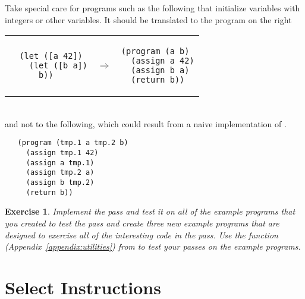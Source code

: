 \documentclass[11pt]{book}
\newtheorem{exercise}[theorem]{Exercise}
\begin{document}
Take special care for programs such as the following that initialize
variables with integers or other variables. It should be translated
to the program on the right \\
\begin{tabular}{lll}
\begin{minipage}{0.4\textwidth}
\begin{lstlisting}
  (let ([a 42])
    (let ([b a])
      b))
\end{lstlisting}
\end{minipage}
&
$\Rightarrow$
&
\begin{minipage}{0.4\textwidth}
\begin{lstlisting}
(program (a b)
  (assign a 42)
  (assign b a)
  (return b))
\end{lstlisting}
\end{minipage}
\end{tabular} \\
and not to the following, which could result from a naive
implementation of .
\begin{lstlisting}
   (program (tmp.1 a tmp.2 b)
     (assign tmp.1 42)
     (assign a tmp.1)
     (assign tmp.2 a)
     (assign b tmp.2)
     (return b))
\end{lstlisting}

\begin{exercise}
\normalfont
Implement the  pass and test it on all of the example
programs that you created to test the  pass and create
three new example programs that are designed to exercise all of the
interesting code in the  pass. Use the 
function (Appendix~\ref{appendix:utilities}) from  to
test your passes on the example programs.
\end{exercise}


\section{Select Instructions}
\label{sec:select-s0}
\end{document}
